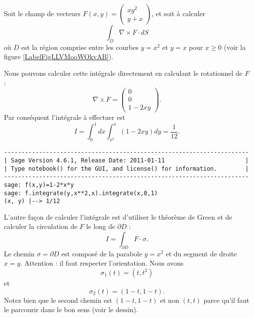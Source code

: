 \begin{example}     \label{ExempleGreenSqL}
    Soit le champ de vecteurs $F(x,y)=\begin{pmatrix}
        xy^2    \\ 
        y+x    
    \end{pmatrix}$, et soit à calculer
    \begin{equation}
        \int_D\nabla\times F\cdot dS
    \end{equation}
    où $D$ est la région comprise entre les courbes $y=x^2$ et $y=x$ pour $x\geq 0$ (voir la figure \ref{LabelFigLLVMooWOkvAB}).

\newcommand{\CaptionFigLLVMooWOkvAB}{Le contour d'intégration pour l'exemple \ref{ExempleGreenSqL}.}


    Nous pouvons calculer cette intégrale directement en calculant le rotationnel de $F$:
    \begin{equation}
        \nabla\times F=\begin{pmatrix}
            0    \\ 
            0    \\ 
            1-2xy    
        \end{pmatrix}.
    \end{equation}
    Par conséquent l'intégrale à effectuer est
    \begin{equation}
        I=\int_0^1 dx\int_{x^2}^x(1-2xy)dy=\frac{1}{ 12 }.
    \end{equation}
    \begin{verbatim}
----------------------------------------------------------------------
| Sage Version 4.6.1, Release Date: 2011-01-11                       |
| Type notebook() for the GUI, and license() for information.        |
----------------------------------------------------------------------
sage: f(x,y)=1-2*x*y
sage: f.integrate(y,x**2,x).integrate(x,0,1)
(x, y) |--> 1/12
    \end{verbatim}
    
    L'autre façon de calculer l'intégrale est d'utiliser le théorème de Green et de calculer la circulation de $F$ le long de $\partial D$ :
    \begin{equation}
        I=\int_{\partial D}F\cdot \sigma.
    \end{equation}
    Le chemin $\sigma=\partial D$ est composé de la parabole $y=x^2$ et du segment de droite $x=y$. Attention : il faut respecter l'orientation. Nous avons
    \begin{equation}
        \sigma_1(t)=(t,t^2)
    \end{equation}
    et
    \begin{equation}
        \sigma_2(t)=(1-t,1-t).
    \end{equation}
    Notez bien que le second chemin est $(1-t,1-t)$ et non $(t,t)$ parce qu'il faut le parcourir dans le bon sens (voir le dessin).


\end{example}
